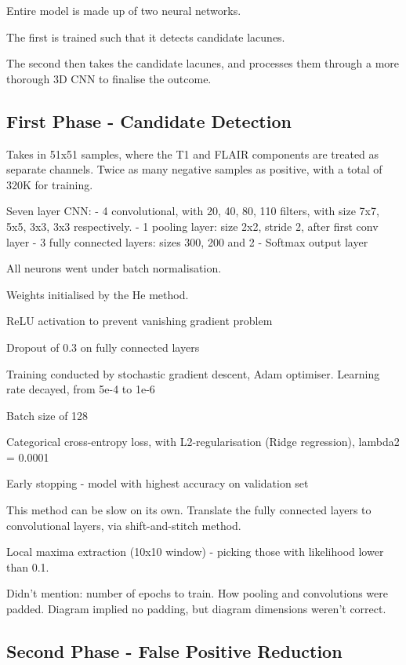 \documentclass[honours,12pt]{unswthesis}
\numberwithin{equation}{section}
\begin{document}
Entire model is made up of two neural networks.

The first is trained such that it detects candidate lacunes.

The second then takes the candidate lacunes, and processes them through a more thorough 3D CNN to finalise the outcome.

\subsection{First Phase - Candidate Detection}

Takes in 51x51 samples, where the T1 and FLAIR components are treated as separate channels. Twice as many negative samples as positive, with a total of 320K for training.

Seven layer CNN:
- 4 convolutional, with 20, 40, 80, 110 filters, with size 7x7, 5x5, 3x3, 3x3 respectively.
- 1 pooling layer: size 2x2, stride 2, after first conv layer
- 3 fully connected layers: sizes 300, 200 and 2
- Softmax output layer

All neurons went under batch normalisation.

Weights initialised by the He method.

ReLU activation to prevent vanishing gradient problem

Dropout of 0.3 on fully connected layers

Training conducted by stochastic gradient descent, Adam optimiser. Learning rate decayed, from 5e-4 to 1e-6

Batch size of 128

Categorical cross-entropy loss, with L2-regularisation (Ridge regression), lambda2 = 0.0001

Early stopping - model with highest accuracy on validation set


This method can be slow on its own. Translate the fully connected layers to convolutional layers, via shift-and-stitch method.

Local maxima extraction (10x10 window) - picking those with likelihood lower than 0.1.


Didn't mention: number of epochs to train. How pooling and convolutions were padded. Diagram implied no padding, but diagram dimensions weren't correct. 

\subsection{Second Phase - False Positive Reduction}
\end{document}
